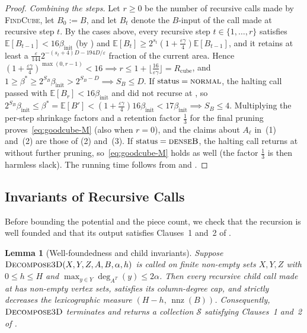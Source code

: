 \documentclass[11pt]{article}
\newtheorem{lemma}[theorem]{Lemma}
\theoremstyle{definition}
\renewcommand{\label}[1]{}%
\newcommand{\E}{\mathbb{E}}
\newcommand{\nnz}{\operatorname{nnz}}
\newcommand{\dens}[1]{\E[#1]}
\newcommand{\FindCube}{\textnormal{\textsc{FindCube}}}
\newcommand{\DecomposeThreeD}{\textnormal{\textsc{Decompose3D}}}
\newcommand{\tagdenseB}{\textnormal{\textsc{denseB}}}
\newcommand{\tagnormal}{\textnormal{\textsc{normal}}}
\begin{document}
\begin{proof}
\emph{Combining the steps.} Let $r \ge 0$ be the number of recursive calls made by \FindCube{}, let $B_0 := B$, and let $B_t$ denote the $B$-input of the call made at recursive step $t$. By the cases above, every recursive step $t \in \{1, \dots, r\}$ satisfies $\dens{B_{t-1}} < 16\beta_{\text{init}}$ (by ) and $\dens{B_t} \ge 2^{s_t}(1 + \frac{\varepsilon\gamma}{4})\dens{B_{t-1}}$, and it retains at least a $\frac{\varepsilon}{144} 2^{-(s_t+4)D - 194D/\varepsilon}$ fraction of the current area. Hence $(1 + \frac{\varepsilon\gamma}{4})^{\max(0, r - 1)} < 16 \implies r \le 1 + \lfloor \frac{16}{\varepsilon\gamma} \rfloor = R_{\text{cube}}$, and $1 \ge \beta^* \ge 2^{S_B}\beta_{\text{init}} > 2^{S_B - D} \implies S_B \le D$. If $\text{status} = \tagnormal$, the halting call passed  with $\dens{B_r} < 16\beta_{\text{init}}$ and did not recurse at , so $2^{S_B}\beta_{\text{init}} \le \beta^* = \dens{B'} < (1 + \frac{\varepsilon\gamma}{4})16\beta_{\text{init}} < 17\beta_{\text{init}} \implies S_B \le 4$. Multiplying the per-step shrinkage factors and a retention factor $\frac{1}{3}$ for the final pruning proves~\eqref{eq:goodcube-M} (also when $r = 0$), and the claims about $A_\ell$ in~(1) and~(2) are those of (2) and~(3). If $\text{status} = \tagdenseB$, the halting call returns at  without further pruning, so~\eqref{eq:goodcube-M} holds as well (the factor $\frac{1}{3}$ is then harmless slack). The running time follows from  and .
\end{proof}

\subsection{Invariants of Recursive Calls}
\label{sec:3d-invariants}

Before bounding the potential and the piece count, we check that the recursion is well founded and that its output satisfies Clauses~1 and~2 of .

\begin{lemma}[Well-foundedness and child invariants]
\label{lem:children-invariants}
Suppose $\DecomposeThreeD(X, Y, Z, A, B, \alpha, h)$ is called on finite non-empty sets $X, Y, Z$ with $0 \le h \le H$ and $\max_{y \in Y}\deg_{A^T}(y) \le 2\alpha$. Then every recursive child call made at  has non-empty vertex sets, satisfies its column-degree cap, and strictly decreases the lexicographic measure $(H - h, \, \nnz(B))$. Consequently, $\DecomposeThreeD$ terminates and returns a collection $\mathcal{S}$ satisfying Clauses~1 and~2 of .
\end{lemma}
\end{document}
